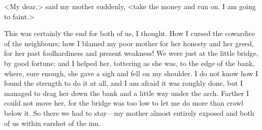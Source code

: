 <My dear,> said my mother suddenly, <take the money and run on. I am going to faint.>

This was certainly the end for both of us, I thought. How I cursed the cowardice of the neighbours; how I blamed my poor mother for her honesty and her greed, for her past foolhardiness and present weakness! We were just at the little bridge, by good fortune; and I helped her, tottering as she was, to the edge of the bank, where, sure enough, she gave a sigh and fell on my shoulder. I do not know how I found the strength to do it at all, and I am afraid it was roughly done, but I managed to drag her down the bank and a little way under the arch. Farther I could not move her, for the bridge was too low to let me do more than crawl below it. So there we had to stay—my mother almost entirely exposed and both of us within earshot of the inn.
